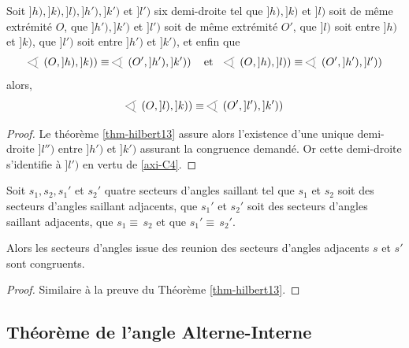 \begin{cor}\label{cor-congrudiffanglecongru}
Soit $]h),]k),]l),]h'),]k')$ et $]l')$ six demi-droite tel que $]h),]k)$ et $]l)$ soit de même extrémité $O$, que $]h'),]k')$ et $]l')$ soit de même extrémité $O'$, que $]l)$ soit entre $]h)$ et $]k)$, que $]l')$ soit entre $]h')$ et $]k')$, et enfin que 
    \begin{equation*}
        \anglesaillant \left(O,]h),]k)\right)\equiv\anglesaillant \left(O',]h'),]k')\right) \quad \text{et} \quad \anglesaillant \left(O,]h),]l)\right)\equiv\anglesaillant \left(O',]h'),]l')\right)
    \end{equation*}
alors,
\begin{equation*}
    \anglesaillant \left(O,]l),]k)\right)\equiv\anglesaillant \left(O',]l'),]k')\right)
\end{equation*}
\begin{proof}
    Le théorème \ref{thm-hilbert13} assure alors l'existence d'une unique demi-droite $]l'')$ entre $]h')$ et $]k')$ assurant la congruence demandé. Or cette demi-droite s'identifie à $]l')$ en vertu de \ref{axi-C4}.
\end{proof}
\end{cor}
\begin{thm}
    Soit $s_1,s_2, s_1'$ et $s_2'$ quatre secteurs d'angles saillant tel que $s_1$ et $s_2$ soit des secteurs d'angles saillant adjacents, que $s_1'$ et $s_2'$ soit des secteurs d'angles saillant adjacents, que $s_1 \equiv \, s_2$ et que $s_1' \equiv \, s_2'$. 

    Alors les secteurs d'angles issue des reunion des secteurs d'angles adjacents $s$ et $s'$ sont congruents. 
\begin{proof}
    Similaire à la preuve du Théorème \ref{thm-hilbert13}.
\end{proof}
\end{thm}

        \subsection{Théorème de l'angle Alterne-Interne}

